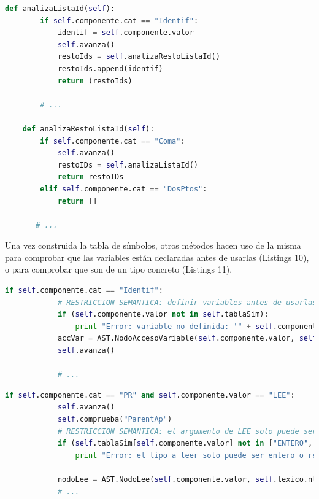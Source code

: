 \documentclass[11pt]{article}
\begin{document}
\begin{minipage}{\linewidth}

	\begin{lstlisting}[language=Python, caption=analizaListaId() y analizaRestoListaId()]
	def analizaListaId(self):
        if self.componente.cat == "Identif":
            identif = self.componente.valor
            self.avanza()
            restoIds = self.analizaRestoListaId()
            restoIds.append(identif)
            return (restoIds)
        
        # ...
    
    def analizaRestoListaId(self):
        if self.componente.cat == "Coma":
            self.avanza()
            restoIDs = self.analizaListaId()
            return restoIDs
        elif self.componente.cat == "DosPtos":
            return []
       
       # ...
     \end{lstlisting}
\end{minipage}
\newpage

Una vez construida la tabla de símbolos, otros métodos hacen uso de la misma para comprobar que las variables están declaradas antes de usarlas (Listings 10), o para comprobar que son de un tipo concreto (Listings 11).

\begin{minipage}{\linewidth}

\begin{lstlisting}[language=Python, caption=analizaInstSimple()]
        if self.componente.cat == "Identif":
		    # RESTRICCION SEMANTICA: definir variables antes de usarlas
            if (self.componente.valor not in self.tablaSim):
                print "Error: variable no definida: '" + self.componente.valor + "' en linea " + str(self.componente.linea)
            accVar = AST.NodoAccesoVariable(self.componente.valor, self.lexico.nlinea, self.tablaSim[self.componente.valor])
            self.avanza()
            
            # ...
    \end{lstlisting}
\end{minipage}

\begin{minipage}{\linewidth}
    \begin{lstlisting}[language=Python, caption=analizaInstES()]          
        if self.componente.cat == "PR" and self.componente.valor == "LEE":
            self.avanza()
            self.comprueba("ParentAp")
            # RESTRICCION SEMANTICA: el argumento de LEE solo puede ser entero o real
            if (self.tablaSim[self.componente.valor] not in ["ENTERO", "REAL"]):
                print "Error: el tipo a leer solo puede ser entero o real (instruccion LEE en linea " + str(self.componente.linea) + ")"

            nodoLee = AST.NodoLee(self.componente.valor, self.lexico.nlinea)
			# ...            
            
	\end{lstlisting}
\end{minipage}
\end{document}
